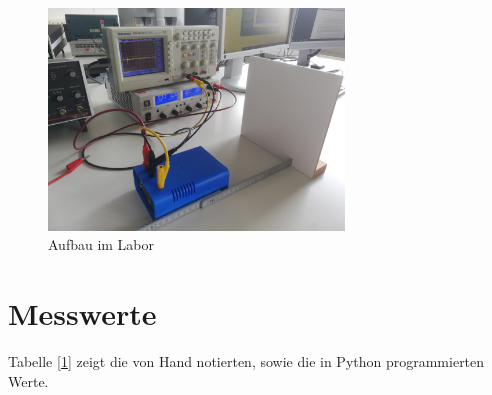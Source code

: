 \documentclass[12pt, oneside, a4paper, \docLanguage]{report}
\begin{document}
\begin{figure}[hbt!]
	\centering\small
	\includegraphics[width=0.7\textwidth]{media/aufbau.jpg}
	\caption{Aufbau im Labor}
	\label{fig:Aufbau im Labor}
\end{figure}
\newpage
\section{Messwerte}
\label{chap:VERSUCH_1_MESSWERTE}
Tabelle [\ref{chap:VERSUCH_1_MESSWERTE}] zeigt die von Hand notierten, sowie die in Python programmierten Werte.
\end{document}
